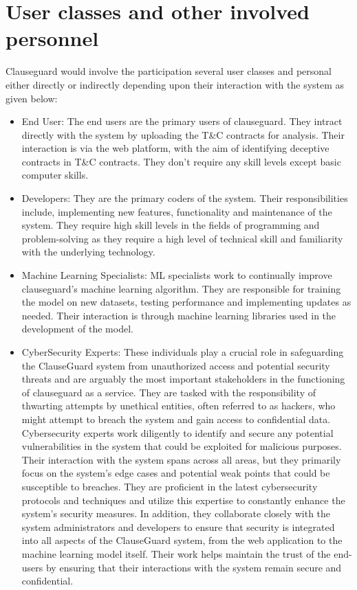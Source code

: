 \section{User classes and other involved personnel \label{Section::User Classes and other involved personnel proposed}}
Clauseguard would involve the participation several user classes and  personal either directly or indirectly depending upon their interaction with the system as given below: 
\begin{itemize}
    \item End User: The end users are the primary users of clauseguard. They intract directly with the system by uploading the T\&C contracts for analysis. Their interaction is via the web platform, with the aim of identifying deceptive contracts in T\&C contracts. They don't require any skill levels except basic computer skills. 
    \item Developers: They are the primary coders of the system. Their responsibilities include, implementing new features, functionality and maintenance of the system. They require high skill levels in the fields of programming and problem-solving as they require a high level of technical skill and familiarity with the underlying technology.
    \item Machine Learning Specialists: ML specialists work to continually improve clauseguard's machine learning algorithm. They are responsible for training the model on new datasets, testing performance and implementing updates as needed. Their interaction is through machine learning libraries used in the development of the model. 
    \item CyberSecurity Experts: These individuals play a crucial role in safeguarding the ClauseGuard system from unauthorized access and potential security threats and are arguably the most important stakeholders in the functioning of clauseguard as a service. They are tasked with the responsibility of thwarting attempts by unethical entities, often referred to as hackers, who might attempt to breach the system and gain access to confidential data. Cybersecurity experts work diligently to identify and secure any potential vulnerabilities in the system that could be exploited for malicious purposes. Their interaction with the system spans across all areas, but they primarily focus on the system's edge cases and potential weak points that could be susceptible to breaches. They are proficient in the latest cybersecurity protocols and techniques and utilize this expertise to constantly enhance the system's security measures. In addition, they collaborate closely with the system administrators and developers to ensure that security is integrated into all aspects of the ClauseGuard system, from the web application to the machine learning model itself. Their work helps maintain the trust of the end-users by ensuring that their interactions with the system remain secure and confidential.

\end{itemize}
